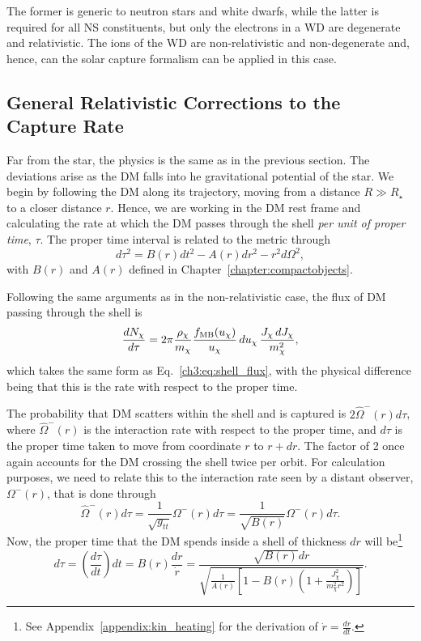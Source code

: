 The former is generic to neutron stars and white dwarfs, while the latter is required for all NS constituents, but only the electrons in a WD are degenerate and relativistic. The ions of the WD are non-relativistic and non-degenerate and, hence, can the solar capture formalism can be applied in this case. 

\subsection{General Relativistic Corrections to the Capture Rate}
\label{ch3:subsec:GR_corr_capture}

Far from the star, the physics is the same as in the previous section. The deviations arise as the DM falls into he gravitational potential of the star. We begin by following the DM along its trajectory, moving from a distance $R\gg R_\star$ to a closer distance $r$. Hence, we are working in the DM rest frame and calculating the rate at which the DM passes through the shell \textit{per unit of proper time}, $\tau$. The proper time interval is related to the metric through
\begin{equation}
    d\tau^2 = B(r) dt^2 - A(r) dr^2 - r^2 d\Omega^2,
\end{equation}
with $B(r)$ and $A(r)$ defined in Chapter~\ref{chapter:compactobjects}. 

Following the same arguments as in the non-relativistic case, the flux of DM passing through the shell is 
\begin{equation}
    \frac{d N_\chi}{d\tau} = 2\pi \frac{\rho_\chi}{m_\chi}\frac{f_{\rm MB}(u_\chi)}{u_\chi}\,du_\chi\,\frac{J_\chi \, dJ_\chi}{m_\chi^2},
\end{equation}
which takes the same form as Eq.~\ref{ch3:eq:shell_flux}, with the physical difference being that this is the rate with respect to the proper time.

The probability that DM scatters within the shell and is captured is $2\hat{\Omega}^-(r) d\tau$,
where $\hat{\Omega}^-(r)$ is the interaction rate with respect to the proper time, and $d\tau$ is the proper time taken to move from coordinate $r$ to $r + dr$. The factor of 2 once again accounts for the DM crossing the shell twice per orbit. For calculation purposes, we need to relate this to the interaction rate seen by a distant observer, $\Omega^-(r)$, that is done through
\begin{equation}
    \hat{\Omega}^-(r) d\tau = \frac{1}{\sqrt{g_{tt}}}\Omega^-(r)d\tau= \frac{1}{\sqrt{B(r)}}\Omega^-(r)d\tau.
\end{equation}
Now, the proper time that the DM spends inside a shell of thickness $dr$ will be\footnote{See Appendix~\ref{appendix:kin_heating} for the derivation of $\dot r = \frac{dr}{dt}$.}
\begin{equation}
    d\tau = \left( \frac{d\tau}{dt}\right) dt = B(r) \frac{dr}{\dot r} = \frac{\sqrt{B(r)} dr}{\sqrt{\frac{1}{A(r)} \left[ 1 - B(r)\left( 1 + \frac{J_\chi^2}{m_\chi^2 r^2} \right) \right]}}.
\end{equation}

